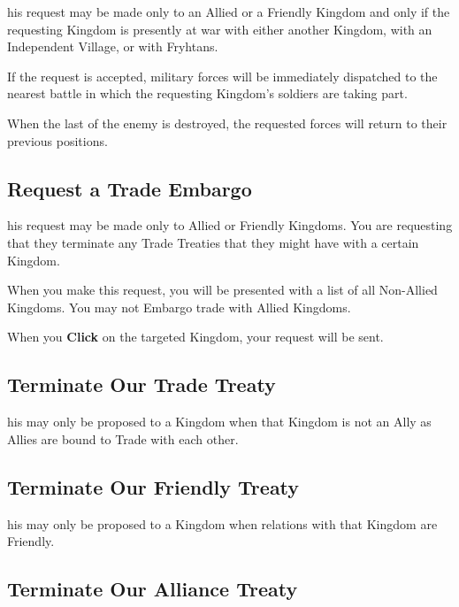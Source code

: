 
his request may be made only to an Allied or a Friendly Kingdom and only if the requesting Kingdom is presently at war with either another Kingdom, with an Independent Village, or with Fryhtans.

If the request is accepted, military forces will be immediately dispatched to the nearest battle in which the requesting Kingdom’s soldiers are taking part.

When the last of the enemy is destroyed, the requested forces will return to their previous positions.

\subsection{Request a Trade Embargo}


his request may be made only to Allied or Friendly Kingdoms. You are requesting that they terminate any Trade Treaties that they might have with a certain Kingdom.


When you make this request, you will be presented with a list of all Non-Allied Kingdoms. You may not Embargo trade with Allied Kingdoms.

When you \textbf{Click} on the targeted Kingdom, your request will be sent.

\subsection{Terminate Our Trade Treaty}


his may only be proposed to a Kingdom when that Kingdom is not an Ally as Allies are bound to Trade with each other.

\subsection{Terminate Our Friendly Treaty}


his may only be proposed to a Kingdom when relations with that Kingdom are Friendly.

\subsection{Terminate Our Alliance Treaty}

